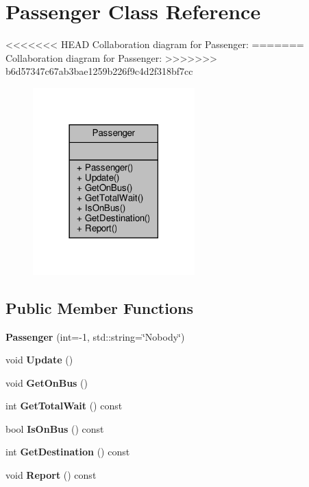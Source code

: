 \hypertarget{classPassenger}{}\section{Passenger Class Reference}
\label{classPassenger}


<<<<<<< HEAD
Collaboration diagram for Passenger\+:\nopagebreak
=======
Collaboration diagram for Passenger\+:
\nopagebreak
>>>>>>> b6d57347c67ab3bae1259b226f9c4d2f318bf7cc
\begin{figure}[H]
\begin{center}
\leavevmode
\includegraphics[width=177pt]{classPassenger__coll__graph}
\end{center}
\end{figure}
\subsection*{Public Member Functions}
\begin{DoxyCompactItemize}
\item 
\mbox{\label{classPassenger_a5c3addb9a6fd03e5e5642ed844e2702c}} 
{\bfseries Passenger} (int=-\/1, std\+::string=\char`\"{}Nobody\char`\"{})
\item 
\mbox{\label{classPassenger_a960de3b29fc17a2c2d79c0b79d5cf299}} 
void {\bfseries Update} ()
\item 
\mbox{\label{classPassenger_ae2ba639cfef39781ac079778578bd9fe}} 
void {\bfseries Get\+On\+Bus} ()
\item 
\mbox{\label{classPassenger_a25158560f790ef7ef06d94c414b34f25}} 
int {\bfseries Get\+Total\+Wait} () const
\item 
\mbox{\label{classPassenger_a2acf008ec444afcc859b914ee24add0e}} 
bool {\bfseries Is\+On\+Bus} () const
\item 
\mbox{\label{classPassenger_a49db0ee527377aae6077df190a11501c}} 
int {\bfseries Get\+Destination} () const
\item 
\mbox{\label{classPassenger_ac54ce797e412a4895febe10f07dc5df5}} 
void {\bfseries Report} () const
\end{DoxyCompactItemize}


